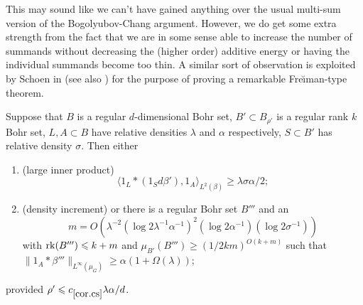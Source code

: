 \documentclass[12pt]{amsart}  %
\begin{document}
This may sound like we can't have gained anything over the usual multi-sum version of the Bogolyubov-Chang argument.  However, we do get some extra strength  from the fact that we are in some sense able to increase the number of summands without decreasing the (higher order) additive energy or having the individual summands become too thin.  A similar sort of observation is exploited by Schoen in \cite{sch::1} (see also \cite{cwasch::}) for the purpose of proving a remarkable Fre{\u\i}man-type theorem.
\begin{corollary}\label{cor.cs} Suppose that $B$ is a regular $d$-dimensional Bohr set, $B' \subset B_{{\rho'}}$ is a regular rank $k$ Bohr set, $L,A \subset B$ have relative densities $\lambda$ and $\alpha$ respectively, $S \subset B'$ has relative density $\sigma$.  Then either
\begin{enumerate}
\item (large inner product)
\begin{equation*}
\langle 1_L \ast (1_Sd\beta'),1_{A} \rangle_{L^2(\beta)} \geq \lambda \sigma \alpha/2;
\end{equation*}
\item (density increment) or there is a regular Bohr set $B'''$ and an 
\begin{equation*}
m=O(\lambda^{-2}(\log2\lambda^{-1}\alpha^{-1})^2(\log 2\alpha^{-1})(\log 2\sigma^{-1}))
\end{equation*}
with $\rk(B''') \leq k + m$ and $\mu_{B'}(B''') \geq (1/2km)^{O(k+m)}$ such that $\|1_A \ast \beta'''\|_{L^\infty(\mu_G)} \geq \alpha(1+\Omega(\lambda))$;
\end{enumerate}
provided ${\rho'} \leq c_{\ref{cor.cs}}\lambda\alpha/d$.
\end{corollary}
\end{document}
